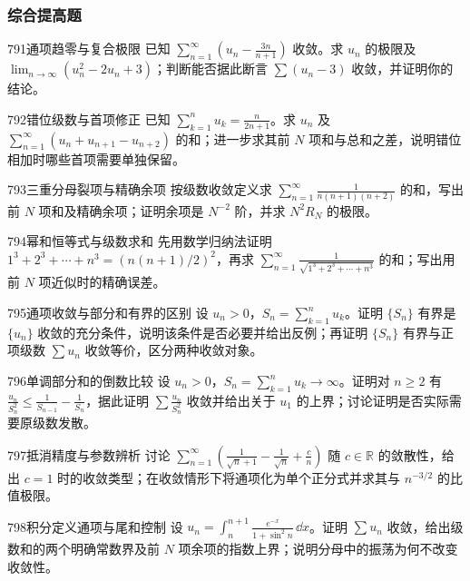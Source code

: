 \subsubsection{综合提高题}
\begin{exercise}{791}{通项趋零与复合极限}
已知 $\sum_{n=1}^{\infty}(u_n-\frac{3n}{n+1})$ 收敛。求 $u_n$ 的极限及 $\lim_{n\to\infty}(u_n^2-2u_n+3)$；判断能否据此断言 $\sum(u_n-3)$ 收敛，并证明你的结论。
\end{exercise}
\begin{exercise}{792}{错位级数与首项修正}
已知 $\sum_{k=1}^{n}u_k=\frac{n}{2n+1}$。求 $u_n$ 及 $\sum_{n=1}^{\infty}(u_n+u_{n+1}-u_{n+2})$ 的和；进一步求其前 $N$ 项和与总和之差，说明错位相加时哪些首项需要单独保留。
\end{exercise}
\begin{exercise}{793}{三重分母裂项与精确余项}
按级数收敛定义求 $\sum_{n=1}^{\infty}\frac1{n(n+1)(n+2)}$ 的和，写出前 $N$ 项和及精确余项；证明余项是 $N^{-2}$ 阶，并求 $N^2R_N$ 的极限。
\end{exercise}
\begin{exercise}{794}{幂和恒等式与级数求和}
先用数学归纳法证明 $1^3+2^3+\cdots+n^3=(n(n+1)/2)^2$，再求 $\sum_{n=1}^{\infty}\frac1{\sqrt{1^3+2^3+\cdots+n^3}}$ 的和；写出用前 $N$ 项近似时的精确误差。
\end{exercise}
\begin{exercise}{795}{通项收敛与部分和有界的区别}
设 $u_n>0$，$S_n=\sum_{k=1}^{n}u_k$。证明 $\{S_n\}$ 有界是 $\{u_n\}$ 收敛的充分条件，说明该条件是否必要并给出反例；再证明 $\{S_n\}$ 有界与正项级数 $\sum u_n$ 收敛等价，区分两种收敛对象。
\end{exercise}
\begin{exercise}{796}{单调部分和的倒数比较}
设 $u_n>0$，$S_n=\sum_{k=1}^{n}u_k\to\infty$。证明对 $n\ge2$ 有 $\frac{u_n}{S_n^2}\le\frac1{S_{n-1}}-\frac1{S_n}$，据此证明 $\sum\frac{u_n}{S_n^2}$ 收敛并给出关于 $u_1$ 的上界；讨论证明是否实际需要原级数发散。
\end{exercise}
\begin{exercise}{797}{抵消精度与参数辨析}
讨论 $\sum_{n=1}^{\infty}(\frac1{\sqrt n+1}-\frac1{\sqrt n}+\frac cn)$ 随 $c\in\mathbb R$ 的敛散性，给出 $c=1$ 时的收敛类型；在收敛情形下将通项化为单个正分式并求其与 $n^{-3/2}$ 的比值极限。
\end{exercise}
\begin{exercise}{798}{积分定义通项与尾和控制}
设 $u_n=\int_n^{n+1}\frac{e^{-x}}{1+\sin^2n}\,\dd x$。证明 $\sum u_n$ 收敛，给出级数和的两个明确常数界及前 $N$ 项余项的指数上界；说明分母中的振荡为何不改变收敛性。
\end{exercise}
